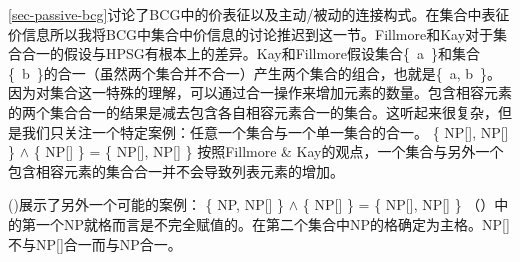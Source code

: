\ref{sec-passive-bcg}讨论了BCG中的价表征以及主动/被动的连接构式。在集合中表征价信息所以我将BCG中集合中价信息的讨论推迟到这一节。Fillmore和Kay对于集合合一的假设与HPSG有根本上的差异。Kay和Fillmore假设集合\{~a~\}和集合\mbox{\{ b \}}的合一（虽然两个集合并不合一）产生两个集合的组合，也就是\{~a, b~\}。因为对集合这一特殊的理解，可以通过合一操作来增加元素的数量。包含相容元素的两个集合合一的结果是减去包含各自相容元素合一的集合。这听起来很复杂，但是我们只关注一个特定案例：任意一个集合与一个单一集合的合一。
\ea
\{ NP[], NP[] \} $\wedge$ \{ NP[] \} = \{ NP[], NP[] \}
\z
按照Fillmore \& Kay的观点，一个集合与另外一个包含相容元素的集合合一并不会导致列表元素的增加。

\noindent
()展示了另外一个可能的案例：
\ea
\{ NP, NP[] \} $\wedge$ \{ NP[] \} = \{ NP[], NP[] \}
\z
（）中的第一个NP就格而言是不完全赋值的。在第二个集合中NP的格确定为主格。NP[]不与NP[]合一而与NP合一。

